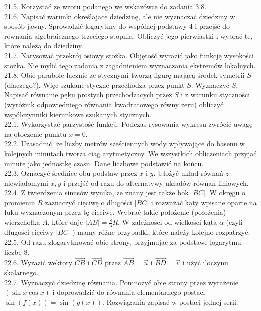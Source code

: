 \documentclass[10pt]{article}
\begin{document}
21.5. Korzystać ze wzoru podanego we wskazówce do zadania 3.8.\\
21.6. Napisać warunki określajace dziedzinę, ale nie wyznaczać dziedziny w sposób jawny. Sprowadzić logarytmy do wspólnej podstawy 4 i przejść do równania algebraicznego trzeciego stopnia. Obliczyć jego pierwiastki i wybrać te, które należą do dziedziny.\\
21.7. Narysować przekrój osiowy stożka. Objętość wyrazić jako funkcję wysokości stożka. Nie mylić tego zadania z zagadnieniem wyznaczania ekstremów lokalnych.\\
21.8. Obie parabole łacznie ze stycznymi tworzą figurę mającą środek symetrii $S$ (dlaczego?). Więc szukane styczne przechodza przez punkt $S$. Wyznaczyć $S$. Napisać równanie pęku prostych przechodzacych przez $S$ i z warunku styczności (wyróżnik odpowiedniego równania kwadratowego równy zeru) obliczyć współczynniki kierunkowe szukanych stycznych.\\
22.1. Wykorzystać parzystość funkcji. Podczas rysowania wykresu zwrócić uwagę na otoczenie punktu $x=0$.\\
22.2. Uzasadnić, że liczby metrów sześciennych wody wpływające do basenu w kolejnych minutach tworza ciag arytmetyczny. We wszystkich obliczeniach przyjać minute jako jednostkę czasu. Dane liczbowe podstawić na końcu.\\
22.3. Oznaczyć średnice obu podstaw przez $x$ i $y$. Ułożyć układ równań $z$ niewiadomymi $x, y$ i przejść od razu do alternatywy układów równań liniowych.\\
22.4. Z twierdzenia sinusów wynika, że znany jest także bok $|B C|$. W okręgu o promieniu $R$ zaznaczyć cięciwę o długości $|B C|$ i rozważać kạty wpisane oparte na łuku wyznaczonym przez tę cięciwę. Wybrać takie położenie (położenia) wierzchołka $A$, które daje $|A B|=\frac{8}{5} R$. W zależności od wielkości kąta $\alpha$ (czyli długości cięciwy $|B C|$ ) mamy różne przypadki, które należy kolejno rozpatrzyć.\\
22.5. Od razu zlogarytmować obie strony, przyjmujac za podstawe logarytmu liczbę 8.\\
22.6. Wyrazić wektory $\overrightarrow{C B}$ i $\overrightarrow{C D}$ przez $\overrightarrow{A B}=\vec{u}$ i $\overrightarrow{B D}=\vec{v}$ i użyć iloczynu skalarnego.\\
22.7. Wyznaczyć dziedzinę równania. Pomnożyć obie strony przez wyrażenie $(\sin x \cos x)$ i doprowadzić do równania elementarnego postaci $\sin (f(x))=\sin (g(x))$. Rozwiązania zapisać w postaci jednej serii.\\
\end{document}
